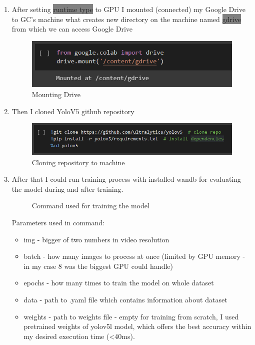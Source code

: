 \begin{enumerate}
    \item After setting \colorbox{Gray}{runtime type} to GPU I mounted (connected) my Google Drive to GC's machine what creates new directory on the machine named \colorbox{Gray}{gdrive} from which we can access Google Drive
    \newline \begin{figure} [h]
        \centering
        \includegraphics{images/train1}
        \caption{Mounting Drive}
        \label{fig:train1}
    \end{figure}
    \item Then I cloned YoloV5 github repository
    \newline \begin{figure} [h]
        \centering
        \includegraphics{images/train2}
        \caption{Cloning repository to machine}
        \label{fig:train2}
    \end{figure}
    \item After that I could run training process with installed wandb for evaluating the model during and after training.
    \newline \begin{figure} [h]
        \centering
        \caption{Command used for training the model}
        \label{fig:train3}
    \end{figure}
    \newline Parameters used in command:
    \begin{itemize}
        \item img - bigger of two numbers in video resolution
        \item batch - how many images to process at once (limited by GPU memory - in my case 8 was the biggest GPU could handle)
        \item epochs - how many times to train the model on whole dataset
        \item data - path to .yaml file which contains information about dataset
        \item weights - path to weights file - empty for training from scratch, I used pretrained weights of yolov5l model, which offers the best accuracy within my desired execution time (<40ms).
    \end{itemize}
\end{enumerate}

